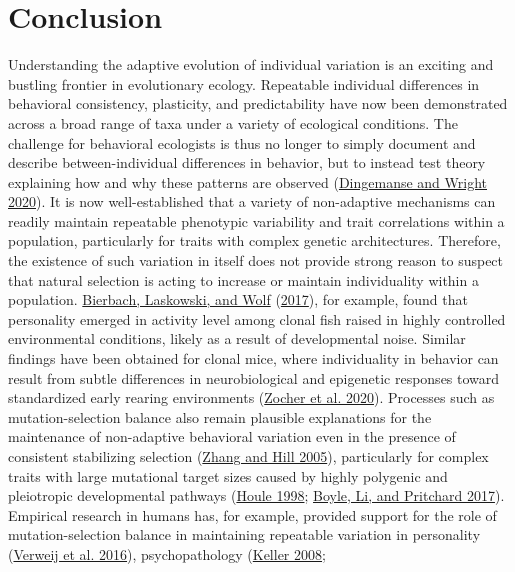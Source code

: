 \documentclass{article}
\begin{document}
\hypertarget{conclusion}{%
\section{Conclusion}\label{conclusion}}

Understanding the adaptive evolution of individual variation is an
exciting and bustling frontier in evolutionary ecology. Repeatable
individual differences in behavioral consistency, plasticity, and
predictability have now been demonstrated across a broad range of taxa
under a variety of ecological conditions. The challenge for behavioral
ecologists is thus no longer to simply document and describe
between-individual differences in behavior, but to instead test theory
explaining how and why these patterns are observed
(\protect\hyperlink{ref-Ding2020}{Dingemanse and Wright 2020}). It is
now well-established that a variety of non-adaptive mechanisms can
readily maintain repeatable phenotypic variability and trait
correlations within a population, particularly for traits with complex
genetic architectures. Therefore, the existence of such variation in
itself does not provide strong reason to suspect that natural selection
is acting to increase or maintain individuality within a population.
\protect\hyperlink{ref-Bierbach2017}{Bierbach, Laskowski, and Wolf}
(\protect\hyperlink{ref-Bierbach2017}{2017}), for example, found that
personality emerged in activity level among clonal fish raised in highly
controlled environmental conditions, likely as a result of developmental
noise. Similar findings have been obtained for clonal mice, where
individuality in behavior can result from subtle differences in
neurobiological and epigenetic responses toward standardized early
rearing environments (\protect\hyperlink{ref-Zocher2020}{Zocher et al.
2020}). Processes such as mutation-selection balance also remain
plausible explanations for the maintenance of non-adaptive behavioral
variation even in the presence of consistent stabilizing selection
(\protect\hyperlink{ref-Zhang2005}{Zhang and Hill 2005}), particularly
for complex traits with large mutational target sizes caused by highly
polygenic and pleiotropic developmental pathways
(\protect\hyperlink{ref-Houle1998}{Houle 1998};
\protect\hyperlink{ref-Boyle2017}{Boyle, Li, and Pritchard 2017}).
Empirical research in humans has, for example, provided support for the
role of mutation-selection balance in maintaining repeatable variation
in personality (\protect\hyperlink{ref-Verw2012}{Verweij et al. 2016}),
psychopathology (\protect\hyperlink{ref-Keller2008}{Keller 2008};
\end{document}
